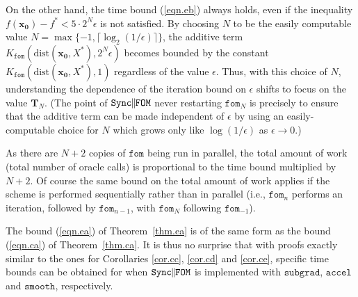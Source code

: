 \documentclass[reqno, 11pt]{amsart}
\numberwithin{equation}{section}
\newcommand{\nt}{\negthinspace}
\newcommand{\fom}{\mathtt{fom}}
\newcommand{\parfom}{\parallel \nt \nt  \mathtt{FOM}}
\newcommand{\subgrad}{\mathtt{subgrad}}
\newcommand{\accel}{\mathtt{accel}}
\newcommand{\smooth}{\mathtt{smooth}}
\newcommand{\sparfom}{\mathtt{Sync} \nt \nt  \parfom}
\newcommand{\dist}{\mathrm{dist}}
\begin{document}
On the other hand, the time bound (\ref{eqn.eb})  always holds, even if the inequality $ f(\mathbf{x_0})-f^*<5\cdot2^N \epsilon $ is not satisfied. By choosing $ N $ to be the easily computable value $ N = \max \{ -1, \lceil \log_2 (1/\epsilon) \rceil \} $, the additive term $ K_{\fom}( \dist(\mathbf{x_0}, X^* ), 2^N \epsilon ) $ becomes bounded by the constant $  K_{\fom}( \dist(\mathbf{x_0}, X^*), 1) $ regardless of the value $ \epsilon $. Thus, with this choice of $ N $, understanding the dependence of the iteration bound on $ \epsilon $ shifts to focus on the value $ \mathbf{T}_N $.     (The point of $ \sparfom $ never restarting $ \fom_N $ is precisely to ensure that the additive term can be made independent of $ \epsilon $ by using an easily-computable choice for $ N $ which grows only like $ \log(1/\epsilon) $ as $ \epsilon \rightarrow 0 $.)

As there are $ N + 2 $ copies of $ \fom $ being run in parallel, the total amount of work (total number of oracle calls) is proportional to the time bound multiplied by $ N +2 $. Of course the same bound on the total amount of work applies if the scheme is performed sequentially rather than in parallel (i.e., $ \fom_n $ performs an iteration, followed by $ \fom_{n-1} $, with $ \fom_N $ following $ \fom_{-1} $). 
\vspace{2mm}

The bound (\ref{eqn.ea})  of Theorem~\ref{thm.ea}  is of the same form as the bound (\ref{eqn.ca})  of Theorem~\ref{thm.ca}.  It is thus no surprise that with proofs exactly similar to the ones for Corollaries \ref{cor.cc}, \ref{cor.cd}  and \ref{cor.ce}, specific time bounds can be obtained for when $ \sparfom $ is implemented with $ \subgrad $, $ \accel $ and $ \smooth $, respectively.
\end{document}
